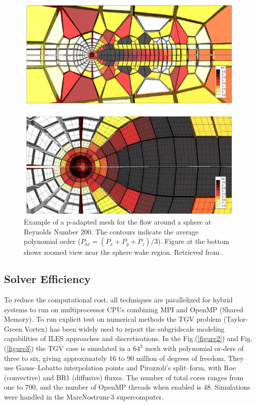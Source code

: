 \documentclass{article}
\begin{document}
  \begin{figure}[htbp]
			\centering
			\includegraphics[scale=0.6]{HW1/fig4.PNG}
			\caption{Example of a p-adapted mesh for the flow around a sphere at Reynolds Number 200. The contours indicate the average polynomial order ($P_{av} =(P_x+P_y+P_z)/3$). Figure at the bottom shows zoomed view near the sphere wake region. Retrieved from \cite{ferrer2023high}.}
			\label{figure1}
		\end{figure}
		
		\subsection{Solver Efficiency}
		To reduce the computational cost, all techniques are parallelized for hybrid systems to run on multiprocessor CPUs combining MPI and OpenMP (Shared Memory). To run explicit test on numerical methods the TGV problem (Taylor-Green Vortex) has been widely used to report the subgridscale modeling capabilities of ILES approaches and discretisations. In the Fig.(\ref{figure2}) and Fig.(\ref{figure3}) the TGV case is simulated in a $64^3$ mesh with polynomial or-ders of three to six, giving approximately 16 to 90 million of degrees of freedom. They use Gauss–Lobatto interpolation points and Pirozzoli’s split–form, with Roe (convective) and BR1 (diffusive) fluxes. The number of total cores ranges from one to 700, and the number of OpenMP threads when enabled is 48. Simulations were handled in the MareNostrum-3 supercomputer. 
   
\end{document}
